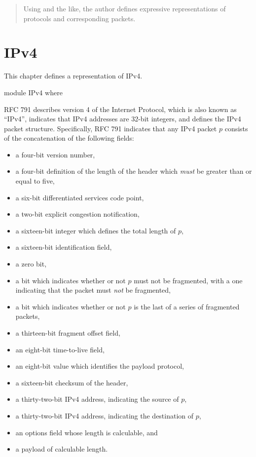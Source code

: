\documentclass{report}
\begin{document}
\begin{abstract}
Using  and the like, the author defines expressive representations of protocols and corresponding packets.
\end{abstract}

\chapter{IPv4}
This chapter defines a representation of IPv4.

\begin{code}
module IPv4 where
\end{code}

RFC 791 describes version 4 of the Internet Protocol, which is also known as ``IPv4'', indicates that IPv4 addresses are 32-bit integers, and defines the IPv4 packet structure.  Specifically, RFC 791 indicates that any IPv4 packet \(p\) consists of the concatenation of the following fields:

\begin{itemize}
  \item a four-bit version number,
  \item a four-bit definition of the length of the header which \emph{must} be greater than or equal to five,
  \item a six-bit differentiated services code point,
  \item a two-bit explicit congestion notification,
  \item a sixteen-bit integer which defines the total length of \(p\),
  \item a sixteen-bit identification field,
  \item a zero bit,
  \item a bit which indicates whether or not \(p\) must not be fragmented, with a one indicating that the packet must \emph{not} be fragmented,
  \item a bit which indicates whether or not \(p\) is the last of a series of fragmented packets,
  \item a thirteen-bit fragment offset field,
  \item an eight-bit time-to-live field,
  \item an eight-bit value which identifies the payload protocol,
  \item a sixteen-bit checksum of the header,
  \item a thirty-two-bit IPv4 address, indicating the source of \(p\),
  \item a thirty-two-bit IPv4 address, indicating the destination of \(p\),
  \item an options field whose length is calculable, and
  \item a payload of calculable length.
\end{itemize}
\end{document}
